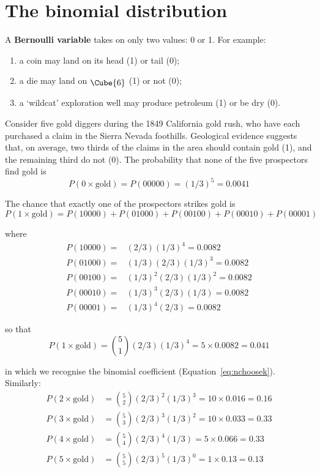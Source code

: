 \chapter{The binomial distribution}
\label{ch:binomial}

A \textbf{Bernoulli variable} takes on only two values: 0 or 1. For
example:

\begin{enumerate}
\item a coin may land on its head (1) or tail (0);
\item a die may land on $\raisebox{-2pt}{\Cube{6}}$ (1) or not (0);
\item a `wildcat' exploration well may produce petroleum (1) or be dry
  (0).
\end{enumerate}

Consider five gold diggers during the 1849 California gold rush, who
have each purchased a claim in the Sierra Nevada foothills. Geological
evidence suggests that, on average, two thirds of the claims in the
area should contain gold (1), and the remaining third do not (0). The
probability that none of the five prospectors find gold is
\[
P(0\times\mbox{gold}) = P(00000) = (1/3)^5 = 0.0041
\]

The chance that exactly one of the prospectors strikes gold is
\[
P(1\times\mbox{gold}) = P(10000) + P(01000) + P(00100) + P(00010) + P(00001)
\]

\noindent where
\begin{align*}
  P(10000) = & (2/3) (1/3)^4 = 0.0082 \\
  P(01000) = & (1/3) (2/3) (1/3)^3 = 0.0082 \\
  P(00100) = & (1/3)^2 (2/3) (1/3)^2 = 0.0082 \\
  P(00010) = & (1/3)^3 (2/3) (1/3) = 0.0082 \\
  P(00001) = & (1/3)^4 (2/3) = 0.0082
\end{align*}

\noindent so that
\[
P(1\times\mbox{gold}) = \binom{5}{1} (2/3) (1/3)^4 = {5}\times{0.0082} = 0.041
\]

\noindent in which we recognise the binomial coefficient
(Equation~\ref{eq:nchoosek}). Similarly:
\begin{align*}
P(2\times\mbox{gold}) & = \binom{5}{2} (2/3)^2 (1/3)^3 = {10}\times{0.016} = 0.16\\
P(3\times\mbox{gold}) & = \binom{5}{3} (2/3)^3 (1/3)^2 = {10}\times{0.033} = 0.33\\
P(4\times\mbox{gold}) & = \binom{5}{4} (2/3)^4 (1/3) = {5}\times{0.066} = 0.33\\
P(5\times\mbox{gold}) & = \binom{5}{5} (2/3)^5 (1/3)^0 = {1}\times{0.13} = 0.13
\end{align*}

